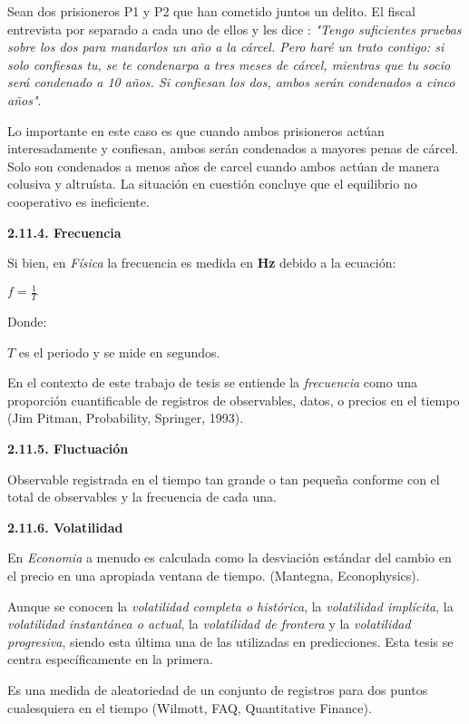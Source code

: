 Sean dos prisioneros P1 y P2  que han cometido juntos un delito. El fiscal entrevista por separado a cada uno de ellos y les dice : \textit{"Tengo suficientes pruebas sobre los dos para mandarlos un año a la cárcel. Pero haré un trato contigo: si solo confiesas tu, se te condenarpa a tres meses de cárcel, mientras que tu socio será condenado a 10 años. Si confiesan los dos, ambos serán condenados a cinco años"}. 

Lo importante en este caso es que cuando ambos prisioneros actúan interesadamente y confiesan, ambos serán condenados a mayores penas de cárcel. Solo son condenados a menos años de carcel cuando ambos actúan de manera colusiva y altruísta. La situación en cuestión concluye que el equilibrio no cooperativo es ineficiente. 
\newpage

{
\noindent
\Large  \textbf{2.11.4. Frecuencia} 
}

Si bien, en \textit{Física} la frecuencia es medida en \textbf{Hz} debido a la ecuación:
\begin{center}
$f=\frac{1}{\textit{T}}$
\end{center}

Donde: 

$\textit{T}  $ es el periodo y se mide en segundos.

En el contexto de este trabajo de tesis se entiende la \textit{frecuencia} como una proporción cuantificable de registros de observables, datos, o precios en el tiempo (Jim Pitman, Probability, Springer, 1993).

{
\noindent
\Large  \textbf{2.11.5. Fluctuación} 
}


Observable registrada en el tiempo tan grande o tan pequeña conforme con el total de observables y la frecuencia de cada una. 

{
\noindent
\Large  \textbf{2.11.6. Volatilidad} 
}

En \textit{Economia} a menudo es calculada como la desviación estándar del cambio en el precio en una apropiada ventana de tiempo. (Mantegna, Econophysics).

Aunque se conocen la \textit{volatilidad completa o histórica}, la \textit{volatilidad implícita}, la  \textit{volatilidad instantánea o actual}, la \textit{volatilidad de frontera} y la \textit{volatilidad progresiva}, siendo esta última una de las utilizadas en predicciones. Esta tesis se centra específicamente en la primera.

Es una medida de aleatoriedad de un conjunto de registros para dos puntos cualesquiera en el tiempo (Wilmott, FAQ, Quantitative Finance). 


